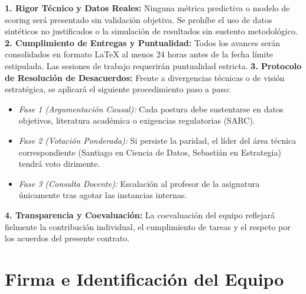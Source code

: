 \documentclass[11pt,a4paper]{article}
\begin{document}
\begin{tcolorbox}[title=Acuerdos Fundamentales de Equipo (Term Sheet)]
\begin{enumerate}[leftmargin=*]
    \textbf{1. Rigor Técnico y Datos Reales:} Ninguna métrica predictiva o modelo de scoring será presentado sin validación objetiva. Se prohíbe el uso de datos sintéticos no justificados o la simulación de resultados sin sustento metodológico.
    \textbf{2. Cumplimiento de Entregas y Puntualidad:} Todos los avances serán consolidados en formato \LaTeX{} al menos 24 horas antes de la fecha límite estipulada. Las sesiones de trabajo requerirán puntualidad estricta.
    \textbf{3. Protocolo de Resolución de Desacuerdos:} Frente a divergencias técnicas o de visión estratégica, se aplicará el siguiente procedimiento paso a paso:
    \begin{itemize}
        \item \textit{Fase 1 (Argumentación Causal):} Cada postura debe sustentarse en datos objetivos, literatura académica o exigencias regulatorias (SARC).
        \item \textit{Fase 2 (Votación Ponderada):} Si persiste la paridad, el líder del área técnica correspondiente (Santiago en Ciencia de Datos, Sebastián en Estrategia) tendrá voto dirimente.
        \item \textit{Fase 3 (Consulta Docente):} Escalación al profesor de la asignatura únicamente tras agotar las instancias internas.
    \end{itemize}
    \textbf{4. Transparencia y Coevaluación:} La coevaluación del equipo reflejará fielmente la contribución individual, el cumplimiento de tareas y el respeto por los acuerdos del presente contrato.
\end{enumerate}
\end{tcolorbox}

\section{Firma e Identificación del Equipo}
\end{document}
